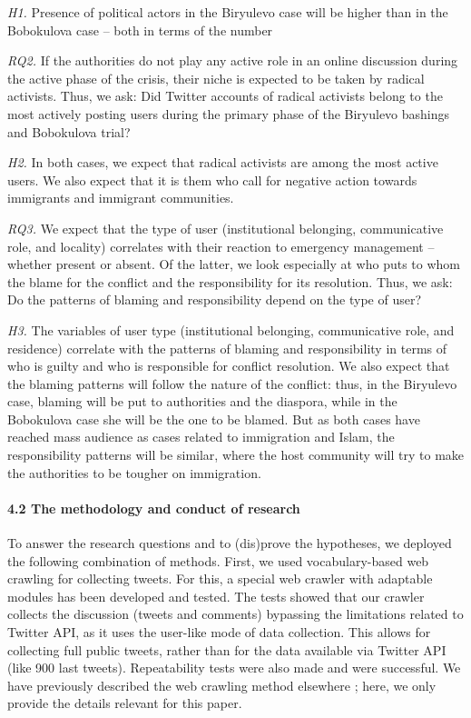\textit{H1.} Presence of political actors in the Biryulevo case will be higher than in the Bobokulova case -- both in terms of the number

\textit{RQ2.} If the authorities do not play any active role in an online discussion during the active phase of the crisis, their niche is expected to be taken by radical activists. Thus, we ask: Did Twitter accounts of radical activists belong to the most actively posting users during the primary phase of the Biryulevo bashings and Bobokulova trial?

\textit{H2.} In both cases, we expect that radical activists are among the most active users. We also expect that it is them who call for negative action towards immigrants and immigrant communities.

\textit{RQ3.} We expect that the type of user (institutional belonging, communicative role, and locality) correlates with their reaction to emergency management – whether present or absent. Of the latter, we look especially at who puts to whom the blame for the conflict and the responsibility for its resolution. Thus, we ask: Do the patterns of blaming and responsibility depend on the type of user?

\textit{H3.} The variables of user type (institutional belonging, communicative role, and residence) correlate with the patterns of blaming and responsibility in terms of who is guilty and who is responsible for conflict resolution. We also expect that the blaming patterns will follow the nature of the conflict: thus, in the Biryulevo case, blaming will be put to authorities and the diaspora, while in the Bobokulova case she will be the one to be blamed. But as both cases have reached mass audience as cases related to immigration and Islam, the responsibility patterns will be similar, where the host community will try to make the authorities to be tougher on immigration.

\paragraph{4.2 The methodology and conduct of research}
To answer the research questions and to (dis)prove the hypotheses, we deployed the following combination of methods. First, we used vocabulary-based web crawling for collecting tweets. For this, a special web crawler with adaptable modules has been developed and tested. The tests showed that our crawler collects the discussion (tweets and comments) bypassing the limitations related to Twitter API, as it uses the user-like mode of data collection. This allows for collecting full public tweets, rather than for the data available via Twitter API (like 900 last tweets). Repeatability tests were also made and were successful. We have previously described the web crawling method elsewhere \cite{BlekanovSergeevMartynenko,BodrunovaBlekanovMaksimov,BodrunovaLitvinenkoGavraYakunin}; here, we only provide the details relevant for this paper.

